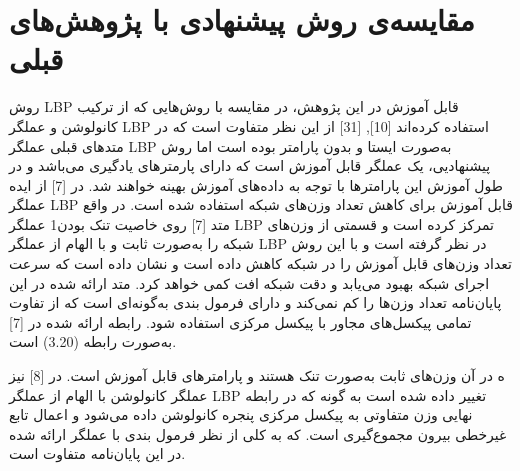 \section{مقایسه‌ی روش پیشنهادی با پژوهش‌های قبلی}
روش LBP قابل آموزش در این پژوهش، در مقایسه با روش‌هایی که از ترکیب کانولوشن و عملگر LBP استفاده کرده‌اند [10], [31] از این نظر متفاوت است که در متدهای قبلی عملگر LBP به‌صورت ایستا و بدون پارامتر بوده است اما روش پیشنهادیی، یک عملگر قابل آموزش است که دارای پارمترهای یادگیری می‌باشد و در طول آموزش این پارامترها با توجه به داده‌های آموزش بهینه خواهند شد.
در [7] از ایده عملگر LBP قابل آموزش برای کاهش تعداد وزن‌های شبکه استفاده شده است. در واقع متد [7] روی خاصیت تنک بودن1 عملگر LBP تمرکز کرده است و قسمتی از وزن‌های شبکه را به‌صورت ثابت و با الهام از عملگر LBP در نظر گرفته است و با این روش تعداد وزن‌های قابل آموزش را در شبکه کاهش داده است و نشان داده است که سرعت اجرای شبکه بهبود می‌یابد و دقت شبکه افت کمی خواهد کرد. متد ارائه شده در این پایان‌نامه تعداد وزن‌ها را کم نمی‌کند و دارای فرمول بندی به‌گونه‌ای است که از تفاوت تمامی پیکسل‌های مجاور با پیکسل مرکزی استفاده شود.
رابطه ارائه شده در [7] به‌صورت رابطه (3.20) است.

ه در آن   وزن‌های ثابت به‌صورت تنک هستند و  پارامترهای قابل آموزش است.
در [8] نیز عملگر کانولوشن با الهام از عملگر LBP تغییر داده شده است به گونه که در رابطه نهایی وزن متفاوتی به پیکسل مرکزی پنجره کانولوشن داده می‌شود و اعمال تابع غیرخطی بیرون مجموع‌گیری است. که به کلی از نظر فرمول بندی با عملگر ارائه شده در این پایان‌نامه متفاوت است. 



 

  




